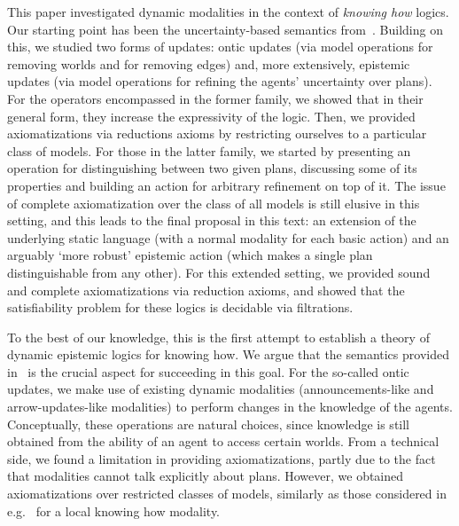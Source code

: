 This paper investigated dynamic modalities in the context of \emph{knowing how} logics. Our starting point has been the uncertainty-based semantics from~\cite{AFSVQ21,AFSVQ23report}. 
Building on this, we studied two forms of updates: ontic updates (via model operations for removing worlds and for removing edges) and, more extensively, epistemic updates (via model operations for refining the agents' uncertainty over plans). For the operators encompassed in the former family, we showed that in their general form, they increase the expressivity of the logic. Then, we provided axiomatizations via reductions axioms by restricting ourselves to a particular class of models. For those in the latter family, we started by presenting an operation for distinguishing between two given plans, discussing some of its properties and building an action for arbitrary refinement on top of it. The issue of complete axiomatization over the class of all models is still elusive in this setting, and this leads to the final proposal in this text: an extension of the underlying static language (with a normal modality for each basic action) and an arguably `more robust' epistemic action (which makes a single plan distinguishable from any other). For this extended setting, we provided sound and complete axiomatizations via reduction axioms, and showed that the satisfiability problem for these logics is decidable via filtrations. 

To the best of our knowledge, this is the first attempt to establish a theory of dynamic epistemic logics for knowing how. We argue that the semantics provided in~\cite{AFSVQ21,AFSVQ23report} is the crucial aspect for succeeding in this goal. For the so-called ontic updates, we make use of existing dynamic modalities (announcements-like and arrow-updates-like modalities) to perform changes in the knowledge of the agents. Conceptually, these operations are natural choices, since knowledge is still obtained from the ability of an agent to access certain worlds. From a technical side, we found a limitation in providing axiomatizations, partly due to the fact that modalities cannot talk explicitly about plans. However, we obtained axiomatizations over restricted classes of models, similarly as those considered in e.g.~\cite{Li21} for a local knowing how modality.

